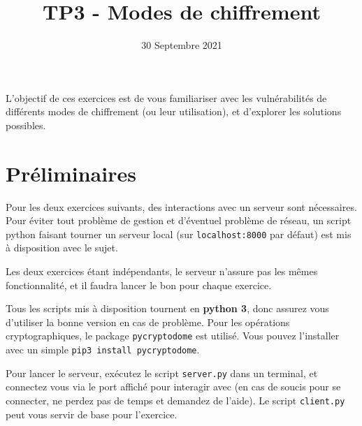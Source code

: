 \documentclass[french,a4paper,11pt]{exam}
\title{\textbf{TP3 - Modes de chiffrement}}
\date{30 Septembre 2021}
\begin{document}
	
	\maketitle
	
	L'objectif de ces exercices est de vous familiariser avec les vulnérabilités de différents modes de chiffrement (ou leur utilisation), et d'explorer les solutions possibles.
		
	

	\begin{center}
	\end{center}

	\section*{Préliminaires}

	Pour les deux exercices suivants, des interactions avec un serveur sont nécessaires. Pour éviter tout problème de gestion et d'éventuel problème de réseau, un script python faisant tourner un serveur local (sur \texttt{localhost:8000} par défaut) est mis à disposition avec le sujet.

	Les deux exercices étant indépendants, le serveur n'assure pas les mêmes fonctionnalité, et il faudra lancer le bon pour chaque exercice. 

	Tous les scripts mis à disposition tournent en \textbf{python 3}, donc assurez vous d'utiliser la bonne version en cas de problème. Pour les opérations cryptographiques, le package \texttt{pycryptodome} est utilisé. Vous pouvez l'installer avec un simple \texttt{pip3 install pycryptodome}.

	Pour lancer le serveur, exécutez le script \texttt{server.py} dans un terminal, et connectez vous via le port affiché pour interagir avec (en cas de soucis pour se connecter, ne perdez pas de temps et demandez de l'aide). Le script \texttt{client.py} peut vous servir de base pour l'exercice.
	\vspace*{0.25cm}
\end{document}
